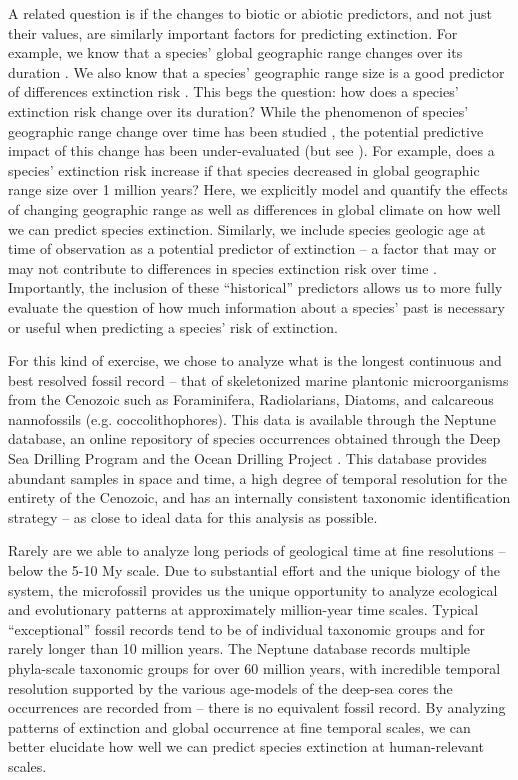 \documentclass[12pt,letterpaper]{article}
\begin{document}
A related question is if the changes to biotic or abiotic predictors, and not just their values, are similarly important factors for predicting extinction. For example, we know that a species' global geographic range changes over its duration \citep{Foote2007,Liow2010,Liow2007,Kiessling2013}. We also know that a species' geographic range size is a good predictor of differences extinction risk \citep{Payne2007,Jablonski2003,Jablonski2008,Jablonski2006}. This begs the question: how does a species' extinction risk change over its duration? While the phenomenon of species' geographic range change over time has been studied \citep{Foote2007,Liow2010,Liow2007,Kiessling2013}, the potential predictive impact of this change has been under-evaluated (but see \citet{Kiessling2013}). For example, does a species' extinction risk increase if that species decreased in global geographic range size over 1 million years? Here, we explicitly model and quantify the effects of changing geographic range as well as differences in global climate on how well we can predict species extinction. Similarly, we include species geologic age at time of observation as a potential predictor of extinction -- a factor that may or may not contribute to differences in species extinction risk over time \citep{Smits2015,Finnegan2008,Ezard2012,VanValen1973,Liow2011,Crampton2016}. Importantly, the inclusion of these ``historical'' predictors allows us to more fully evaluate the question of how much information about a species' past is necessary or useful when predicting a species' risk of extinction.

For this kind of exercise, we chose to analyze what is the longest continuous and best resolved fossil record -- that of skeletonized marine plantonic microorganisms from the Cenozoic such as Foraminifera, Radiolarians, Diatoms, and calcareous nannofossils (e.g. coccolithophores). This data is available through the Neptune database, an online repository of species occurrences obtained through the Deep Sea Drilling Program and the Ocean Drilling Project \citep{Lazarus1994,SpencerCervato1999}. This database provides abundant samples in space and time, a high degree of temporal resolution for the entirety of the Cenozoic, and has an internally consistent taxonomic identification strategy -- as close to ideal data for this analysis as possible. 

Rarely are we able to analyze long periods of geological time at fine resolutions -- below the 5-10 My scale. Due to substantial effort and the unique biology of the system, the microfossil provides us the unique opportunity to analyze ecological and evolutionary patterns at approximately million-year time scales. Typical ``exceptional'' fossil records tend to be of individual taxonomic groups and for rarely longer than 10 million years. The Neptune database records multiple phyla-scale taxonomic groups for over 60 million years, with incredible temporal resolution supported by the various age-models of the deep-sea cores the occurrences are recorded from -- there is no equivalent fossil record. By analyzing patterns of extinction and global occurrence at fine temporal scales, we can better elucidate how well we can predict species extinction at human-relevant scales.
\end{document}
